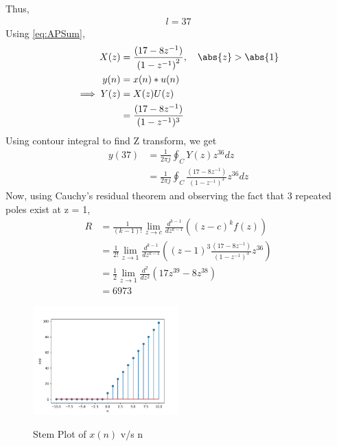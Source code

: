 \documentclass[journal,12pt,twocolumn]{IEEEtran}
\theoremstyle{remark}
\begin{document}
Thus,
\begin{align}{l = 37}\end{align}
Using \eqref{eq:APSum},
\begin{align}
	X(z) &= \frac{(17-8z^{-1})}{{(1-z^{-1})}^2},
\quad \abs{z} > \abs{1}\\
y(n) &= x(n) * u(n)\\
\implies Y(z) &= X(z)U(z)\\
&= \frac{(17-8z^{-1})}{(1-z^{-1})^{3}}\end{align}
\bigskip
Using contour integral to find Z transform, we get
\begin{align}
    y(37) &= \frac{1}{2\pi j} \oint _C Y(z)z^{36}dz\\
    &= \frac{1}{2\pi j} \oint _C \frac{(17-8z^{-1})}{(1-z^{-1})^{3}}z^{36}dz
\end{align}
Now, using Cauchy's residual theorem and observing the fact that 3 repeated poles exist at z = 1, 
\begin{align}
    R &= \frac{1}{(k-1)!}\lim_{z \to c}\frac{d^{k-1}}{dz^{k-1}}((z-c)^kf(z))\\
    &= \frac{1}{2!}\lim_{z \to 1}\frac{d^{k-1}}{dz^{k-1}}((z-1)^3\frac{(17-8z^{-1})}{(1-z^{-1})^{3}}z^{36})\\
    &=\frac{1}{2}\lim_{z \to 1}\frac{d^2}{dz^2}(17z^{39} - 8z^{38})\\
    &= 6973
\end{align}
\begin{figure}[h]
    \includegraphics[width=0.5\textwidth]{ncert-maths/10/5/3/6/figs/x(n)_plot.png}\label{fig:stem-plot}
    \caption{Stem Plot of $x(n)$ v/s n}
\end{figure}
\end{document}
